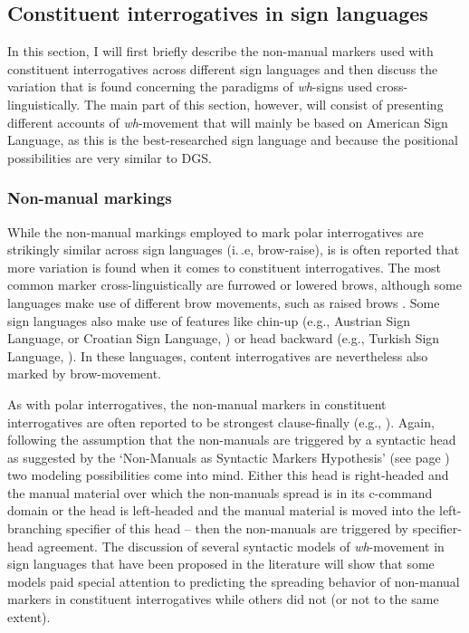 \subsection{Constituent interrogatives in sign languages}\label{whsigned}
In this section, I will first briefly describe the non-manual markers used with constituent interrogatives across different sign languages and then discuss the variation that is found concerning the paradigms of \textit{wh}-signs used cross-linguistically. The main part of this section, however, will consist of presenting different accounts of \textit{wh}-movement that will mainly be based on American Sign Language, as this is the best-researched sign language and because the positional possibilities are very similar to  DGS. %


\subsubsection{Non-manual markings}
While the non-manual markings employed to mark polar interrogatives are strikingly similar across sign languages (i.\,.e, brow-raise), is is often reported that more variation is found when it comes to constituent interrogatives. The most common marker cross-linguistically are furrowed or lowered brows, although some languages make use of different brow movements, such as raised brows \citep{zeshan2004interrogative}. Some sign languages also make use of features like chin-up (e.g., Austrian Sign Language, \citealt{sarac2007cross} or Croatian Sign Language, \citealt{sarac2006interrogative}) or head backward (e.g., Turkish Sign Language, \citealt{goksel2013phonological}). In these languages, content interrogatives are nevertheless also marked by brow-movement.

As with polar interrogatives, the non-manual markers in constituent interrogatives are often reported to be strongest clause-finally (e.g., \citealt{sandler2006sign}). Again, following the assumption that the non-manuals are triggered by a syntactic head as suggested by the `Non-Manuals as Syntactic Markers Hypothesis' (see page \pageref{nmasmh}) two modeling possibilities come into mind. Either this head is right-headed and the manual material over which the non-manuals spread is in its c-command domain or the head is left-headed and the manual material is moved into the left-branching specifier of this head -- then the non-manuals are triggered by specifier-head agreement. The discussion of several syntactic models of \textit{wh}-movement in sign languages that have been proposed in the literature will show that some models paid special attention to predicting the spreading behavior of non-manual markers in constituent interrogatives while others did not (or not to the same extent).


